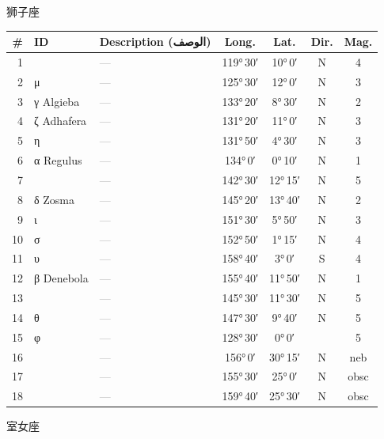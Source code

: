\documentclass[9pt,a4paper]{extarticle}
\newcommand{\ar}[1]{{\arabicfont\textarabic{#1}}}
\begin{document}
\vspace{4pt}\quad\ar{الأسد}\quad 狮子座
\begin{longtable}{r l >{\raggedright\arraybackslash}p{6.7cm} c c c c}
\toprule \# & ID & Description (\ar{الوصف}) & Long. & Lat. & Dir. & Mag.\\ \midrule\endhead
1 &  & \textcolor{gray}{—} & 119°\,30′ & 10°\,0′ & N & 4\\
2 & μ & \textcolor{gray}{—} & 125°\,30′ & 12°\,0′ & N & 3\\
3 & γ Algieba & \textcolor{gray}{—} & 133°\,20′ & 8°\,30′ & N & 2\\
4 & ζ Adhafera & \textcolor{gray}{—} & 131°\,20′ & 11°\,0′ & N & 3\\
5 & η & \textcolor{gray}{—} & 131°\,50′ & 4°\,30′ & N & 3\\
6 & α Regulus & \textcolor{gray}{—} & 134°\,0′ & 0°\,10′ & N & 1\\
7 &  & \textcolor{gray}{—} & 142°\,30′ & 12°\,15′ & N & 5\\
8 & δ Zosma & \textcolor{gray}{—} & 145°\,20′ & 13°\,40′ & N & 2\\
9 & ι & \textcolor{gray}{—} & 151°\,30′ & 5°\,50′ & N & 3\\
10 & σ & \textcolor{gray}{—} & 152°\,50′ & 1°\,15′ & N & 4\\
11 & υ & \textcolor{gray}{—} & 158°\,40′ & 3°\,0′ & S & 4\\
12 & β Denebola & \textcolor{gray}{—} & 155°\,40′ & 11°\,50′ & N & 1\\
13 &  & \textcolor{gray}{—} & 145°\,30′ & 11°\,30′ & N & 5\\
14 & θ & \textcolor{gray}{—} & 147°\,30′ & 9°\,40′ & N & 5\\
15 & φ & \textcolor{gray}{—} & 128°\,30′ & 0°\,0′ &  & 5\\
16 &  & \textcolor{gray}{—} & 156°\,0′ & 30°\,15′ & N & neb\\
17 &  & \textcolor{gray}{—} & 155°\,30′ & 25°\,0′ & N & obsc\\
18 &  & \textcolor{gray}{—} & 159°\,40′ & 25°\,30′ & N & obsc\\
\bottomrule\end{longtable}
\vspace{4pt}\quad\ar{السنبلة}\quad 室女座
\end{document}
